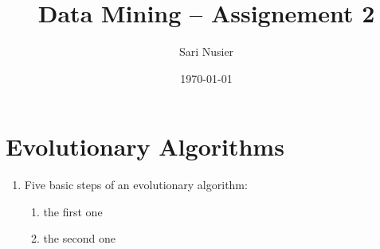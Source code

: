 \documentclass[12pt,a4paper]{article}
\begin{document}
\begin{titlepage}
	\centering
	\title{Data Mining -- Assignement 2}
	\author{Sari Nusier}
	\date{\today}
	\maketitle
\end{titlepage}


\section{Evolutionary Algorithms}
	\begin{enumerate}[label=(\alph*)]
		\item Five basic steps of an evolutionary algorithm:
			\begin{enumerate}[label=\roman*.]
				\item the first one
				\item the second one
			\end{enumerate}
	\end{enumerate}
\end{document}
